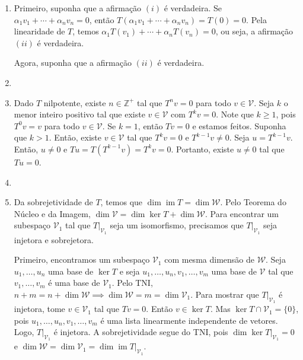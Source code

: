 \documentclass{article}
\DeclareMathOperator{\im}{im}
\begin{document}
\begin{enumerate}
\begin{enumerate}
            \item[(d)]
        \end{enumerate}
    \item[\textbf{E6}] Primeiro, suponha que a afirmação \((i)\) é verdadeira. Se \(\alpha_1 v_1 + \cdots + \alpha_n v_n = 0\), então \(T(\alpha_1 v_1 + \cdots + \alpha_n v_n) = T(0) = 0\). Pela linearidade de \(T\), temos \(\alpha_1 T(v_1) + \cdots + \alpha_n T(v_n) = 0\), ou seja, a afirmação \((ii)\) é verdadeira.
    
    Agora, suponha que a afirmação \((ii)\) é verdadeira. 
    \item[\textbf{E7}] 
    \item[\textbf{E8}] Dado \(T\) nilpotente, existe \(n \in \mathbb{Z}^{+}\) tal que \(T^n v=0\) para todo \(v \in \mathcal{V}\). Seja \(k\) o menor inteiro positivo tal que existe \(v \in \mathcal{V}\) com \(T^k v = 0\). Note que \(k \geq 1\), pois \(T^0 v = v\) para todo \(v \in \mathcal{V}\). Se \(k=1\), então \(T v = 0\) e estamos feitos. Suponha que \(k > 1\). Então, existe \(v \in \mathcal{V}\) tal que \(T^k v = 0\) e \(T^{k-1} v \neq 0\). Seja \(u = T^{k-1} v\). Então, \(u \neq 0\) e \(T u = T(T^{k-1} v) = T^k v = 0\). Portanto, existe \(u \neq 0\) tal que \(T u = 0\).
    \item[\textbf{E9}] 
    \item[\textbf{E10}] Da sobrejetividade de \(T\), temos que \(\dim \im T = \dim \mathcal{W}\). Pelo Teorema do Núcleo e da Imagem, \(\dim \mathcal{V} = \dim \ker T + \dim \mathcal{W}\). 
    Para encontrar um subespaço \(\mathcal{V}_1\) tal que \(T\vert_{\mathcal{V}_1}\) seja um isomorfismo, precisamos que \(T\vert_{\mathcal{V}_1}\) seja injetora e sobrejetora.

    Primeiro, encontramos um subespaço \(\mathcal{V}_1\) com mesma dimensão de \(\mathcal{W}\). Seja \(u_1, \ldots, u_n\) uma base de \(\ker T\) e seja \(u_1, \ldots, u_n, v_1, \ldots, v_m\) uma base de \(\mathcal{V}\) tal que \(v_1, \ldots, v_m\) é uma base de \(\mathcal{V}_1\).
    Pelo TNI, \(n+m = n+\dim \mathcal{W} \implies \dim \mathcal{W} = m = \dim \mathcal{V}_1\). Para mostrar que \(T\vert_{\mathcal{V}_1}\) é injetora, tome \(v \in \mathcal{V}_1\) tal que \(Tv=0\).
    Então \(v \in \ker T\). Mas \(\ker T \cap \mathcal{V}_1 = \{0\}\), pois \(u_1, \ldots, u_n, v_1, \ldots, v_m\) é uma lista linearmente independente de vetores. Logo, \(T\vert_{\mathcal{V}_1}\) é injetora.
    A sobrejetividade segue do TNI, pois \(\dim \ker T\vert_{\mathcal{V}_1} = 0\) e \(\dim \mathcal{W} = \dim \mathcal{V}_1 = \dim \im T\vert_{\mathcal{V}_1}\).


\end{enumerate}
\end{document}
